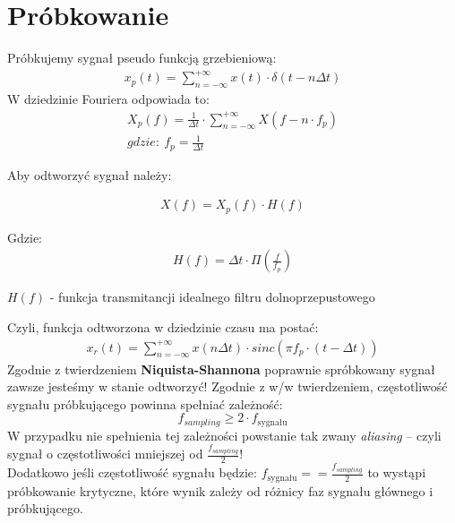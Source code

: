  \newpage
 \section{Próbkowanie}
    \tab Próbkujemy sygnał pseudo funkcją grzebieniową:
    \begin{gather*}
        x_p(t) = \sum_{n=-\infty}^{+\infty}x(t)\cdot \delta(t-n\Delta t)
    \end{gather*}
    W dziedzinie Fouriera odpowiada to:
    \begin{gather*}
        X_p(f) = \frac{1}{\Delta t} \cdot \sum_{n=-\infty}^{+\infty} X(f-n\cdot f_p)\\
        gdzie:\ f_p = \frac{1}{\Delta t}
    \end{gather*}

    \noindent Aby odtworzyć sygnał należy:
    \begin{multicols}{2}
        \begin{gather*}
            X(f) = X_p(f)\cdot H(f)
        \end{gather*}
        
        Gdzie:
        \begin{gather*}
            H(f) = \Delta t \cdot\Pi\left(\frac{f}{f_p}\right)
        \end{gather*}
    \end{multicols}
    \begin{center}
        $H(f)$ - funkcja transmitancji idealnego filtru dolnoprzepustowego
    \end{center}
    Czyli, funkcja odtworzona w dziedzinie czasu ma postać:
    \begin{gather*}
        x_r(t) = \sum_{n=-\infty}^{+\infty} x(n\Delta t) \cdot sinc(\pi f_p \cdot
        (t-\Delta t))
    \end{gather*}
    Zgodnie z twierdzeniem \textbf{Niquista-Shannona} poprawnie spróbkowany sygnał zawsze jesteśmy w stanie odtworzyć!
    Zgodnie z w/w twierdzeniem, częstotliwość sygnału próbkującego powinna spełniać zależność:
    \begin{equation*}
        f_{sampling} \ge 2\cdot f_{\text{sygnału}}
    \end{equation*}
    W przypadku nie spełnienia tej zależności powstanie tak zwany \textit{aliasing} -- czyli sygnał o częstotliwości mniejszej od $\frac{f_{sampling}}{2}$!\\
    Dodatkowo jeśli częstotliwość sygnału będzie: $f_{\text{sygnału}} == \frac{f_{sampling}}{2}$ to wystąpi próbkowanie krytyczne, które wynik zależy od różnicy faz sygnału głównego i próbkującego.
    